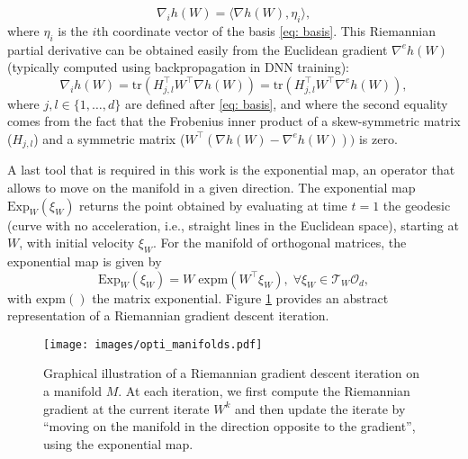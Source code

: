 \documentclass{article}
\def \grad {\nabla}
\newcommand{\tr}[1]{\mathrm{tr}\left(#1 \right)}
\newcommand{\expm}[1]{\mathrm{expm}\left(#1 \right)}
\begin{document}
\begin{equation} \label{eq: partial}
    \grad_{i} h(W) = \langle \grad h(W), \eta_i \rangle,
\end{equation}
where $\eta_i$ is the $i$th coordinate vector of the basis \eqref{eq: basis}. This Riemannian partial derivative can be obtained easily from the Euclidean gradient $\nabla^e h(W)$ (typically computed using backpropagation in DNN training):
\begin{equation}\label{eq:partialderiv}
   \grad_{i} h(W)  = \tr{H_{j,l}^\top W^{\top} \grad h(W)} = \tr{H_{j,l}^\top W^{\top} \nabla^e h(W)},
\end{equation}
where $j, l \in \{1, \dots, d\}$ are defined after \eqref{eq: basis}, and where the second equality comes from the fact that the Frobenius inner product of a skew-symmetric matrix ($H_{j,l}$) and a symmetric matrix ($W^{\top} (\grad h(W) - \nabla^e h(W)))$ is zero.

A last tool that is required in this work is the exponential map, an operator that allows to move on the manifold in a given direction. The exponential map $\mathrm{Exp}_W (\xi_W)$ returns the point obtained by evaluating at time $t = 1$ the geodesic (curve with no acceleration, i.e., straight lines in the Euclidean space), starting at  $W$, with initial velocity $\xi_W$. For the manifold of orthogonal matrices, the exponential map is given by
\begin{equation} \label{eq:exp}
    \mathrm{Exp}_W (\xi_W) = W \; \expm{ W^\top \xi_W}, \; \forall \xi_W \in \mathcal{T}_W \mathcal{O}_d,
\end{equation}
with $\expm{}$ the matrix exponential. Figure \ref{fig:opti_manifold} provides an abstract representation of a Riemannian gradient descent iteration.

\begin{figure}
    \centering
    \texttt{[image: images/opti\_manifolds.pdf]}
    \caption{Graphical illustration of a Riemannian gradient descent iteration on a manifold $M$. At each iteration, we first compute the Riemannian gradient at the current iterate $W^k$ and then update the iterate by ``moving on the manifold in the direction opposite to the gradient'', using the exponential map. }
    \label{fig:opti_manifold}
\end{figure}
\end{document}
